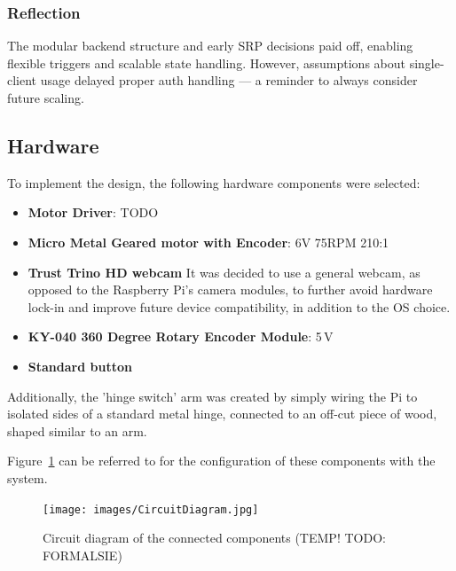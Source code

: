             \subsubsection*{Reflection}
                The modular backend structure and early SRP decisions paid off, enabling flexible triggers and scalable state handling. However, assumptions about single-client usage delayed proper auth handling — a reminder to always consider future scaling.
    
        \subsection{Hardware}
    
            To implement the design, the following hardware components were selected:
    
            \begin{itemize}
                \item \textbf{Motor Driver}: TODO
                \item \textbf{Micro Metal Geared motor with Encoder}: 6V 75RPM 210:1
                \item \textbf{Trust Trino HD webcam} It was decided to use a general webcam, as opposed to the Raspberry Pi's camera modules, to further avoid hardware lock-in and improve future device compatibility, in addition to the OS choice.
                \item \textbf{KY-040 360 Degree Rotary Encoder Module}: 5\,V
                \item \textbf{Standard button}
            \end{itemize}
    
            Additionally, the 'hinge switch' arm was created by simply wiring the Pi to isolated sides of a standard metal hinge, connected to an off-cut piece of wood, shaped similar to an arm.
    
            Figure~\ref{fig:circuitDiagram} can be referred to for the configuration of these components with the system.
    
            \begin{figure}
                \centering
                \texttt{[image: images/CircuitDiagram.jpg]}
                \caption{Circuit diagram of the connected components (TEMP! TODO: FORMALSIE)}
                \label{fig:circuitDiagram}
            \end{figure}
        
